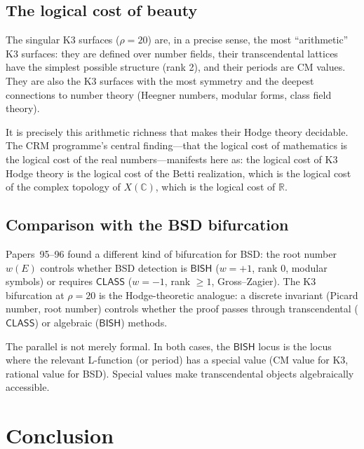 \documentclass[11pt,a4paper]{article}
\theoremstyle{plain}
\theoremstyle{definition}
\newcommand{\BISH}{\textsf{BISH}}
\newcommand{\CLASS}{\textsf{CLASS}}
\newcommand{\R}{\mathbb{R}}
\newcommand{\C}{\mathbb{C}}
\begin{document}
\subsection{The logical cost of beauty}

The singular K3 surfaces ($\rho = 20$) are, in a precise sense, the most ``arithmetic'' K3 surfaces: they are defined over number fields, their transcendental lattices have the simplest possible structure (rank 2), and their periods are CM values. They are also the K3 surfaces with the most symmetry and the deepest connections to number theory (Heegner numbers, modular forms, class field theory).

It is precisely this arithmetic richness that makes their Hodge theory decidable. The CRM programme's central finding---that the logical cost of mathematics is the logical cost of the real numbers---manifests here as: the logical cost of K3 Hodge theory is the logical cost of the Betti realization, which is the logical cost of the complex topology of $X(\C)$, which is the logical cost of $\R$.

\subsection{Comparison with the BSD bifurcation}

Papers~95--96 found a different kind of bifurcation for BSD: the root number $w(E)$ controls whether BSD detection is $\BISH$ ($w = +1$, rank 0, modular symbols) or requires $\CLASS$ ($w = -1$, rank $\geq 1$, Gross--Zagier). The K3 bifurcation at $\rho = 20$ is the Hodge-theoretic analogue: a discrete invariant (Picard number, root number) controls whether the proof passes through transcendental ($\CLASS$) or algebraic ($\BISH$) methods.

The parallel is not merely formal. In both cases, the $\BISH$ locus is the locus where the relevant L-function (or period) has a special value (CM value for K3, rational value for BSD). Special values make transcendental objects algebraically accessible.


\section{Conclusion}\label{sec:conclusion}
\end{document}
